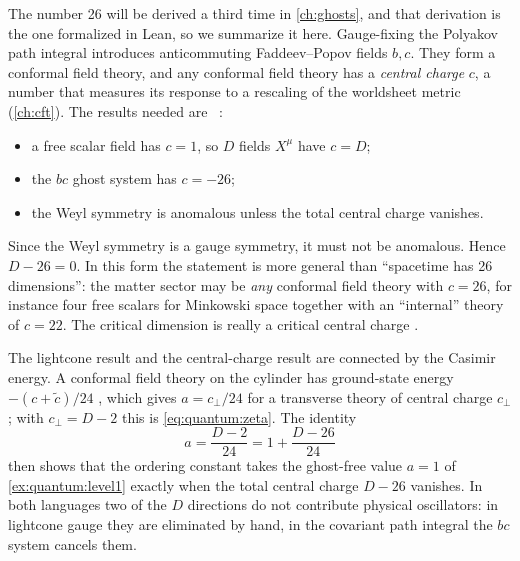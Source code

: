 The number 26 will be derived a third time in \cref{ch:ghosts}, and that derivation is the
one formalized in Lean, so we summarize it here. Gauge-fixing the Polyakov path integral
introduces anticommuting Faddeev--Popov fields $b,c$. They form a conformal field theory, and
any conformal field theory has a \emph{central charge} $c$, a number
that measures its response to a rescaling of the worldsheet metric (\cref{ch:cft}). The
results needed are \TL\ :
\begin{itemize}[leftmargin=*]
\item a free scalar field has $c=1$, so $D$ fields $X^\mu$ have $c=D$;
\item the $bc$ ghost system has $c=-26$;
\item the Weyl symmetry is anomalous unless the total central charge vanishes.
\end{itemize}
Since the Weyl symmetry is a gauge symmetry, it must not be anomalous. Hence $D-26=0$. In
this form the statement is more general than ``spacetime has 26 dimensions'': the matter
sector may be \emph{any} conformal field theory with $c=26$, for instance four free scalars
for Minkowski space together with an ``internal'' theory of $c=22$. The critical dimension
is really a critical central charge .

The lightcone result and the central-charge result are connected by the Casimir energy. A
conformal field theory on the cylinder has ground-state energy $-(c+\tilde c)/24$
, which gives $a=c_\perp/24$ for a transverse theory of
central charge $c_\perp$; with $c_\perp=D-2$ this is \cref{eq:quantum:zeta}. The identity
\[
 a=\frac{D-2}{24}=1+\frac{D-26}{24}
\]
then shows that the ordering constant takes the ghost-free value $a=1$ of
\cref{ex:quantum:level1} exactly when the total central charge $D-26$ vanishes. In both
languages two of the $D$ directions do not contribute physical oscillators: in lightcone
gauge they are eliminated by hand, in the covariant path integral the $bc$ system cancels
them.

